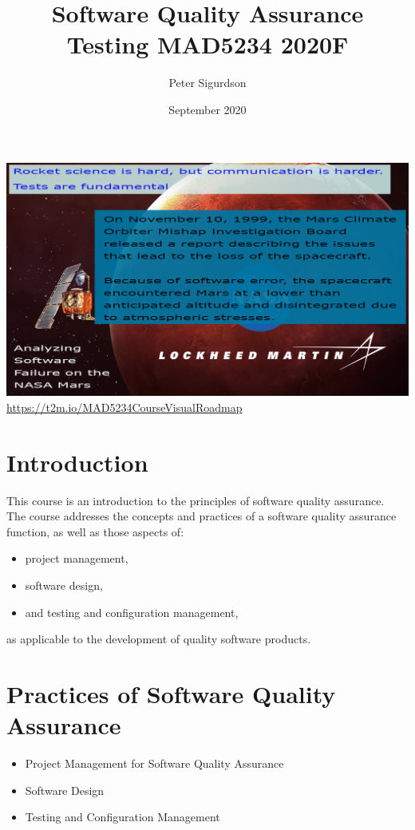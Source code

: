 \documentclass{article}
\title{Software Quality Assurance Testing MAD5234 2020F}
\author{Peter Sigurdson}
\date{September 2020}
\begin{document}
\maketitle
\includegraphics[scale=.5]{img/MarsClimateOrbiter.png}
\url{https://t2m.io/MAD5234CourseVisualRoadmap}



\newpage

\section * {Introduction}
 This course is an introduction to the principles of software quality assurance. \\
 The course addresses the concepts and practices of a software quality assurance function, as well as those aspects of:
 \begin{itemize}
     \item  project management, 
     \item  software design,      
     \item  and testing and configuration management,     
 \end{itemize}
 as applicable to the development of quality software products.
 \newline
 
 \section * {Practices of Software Quality Assurance}   
 \begin{itemize}
     \item Project Management for Software Quality Assurance
     \item Software Design     
     \item Testing and Configuration Management     
 \end{itemize}



\end{document}
